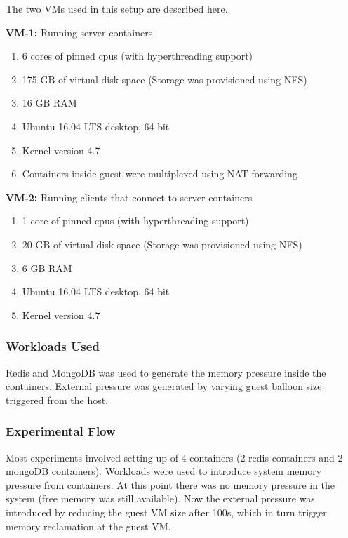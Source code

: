 	The two VMs used in this setup are described here.
	
	\noindent \textbf{VM-1:} Running server containers
	\begin{enumerate}
	  \item 6 cores of pinned cpus (with hyperthreading support)
	  \item 175 GB of virtual disk space (Storage was provisioned using NFS)
	  \item 16 GB RAM
	  \item Ubuntu 16.04 LTS desktop, 64 bit
	  \item Kernel version 4.7
	  \item Containers inside guest were multiplexed using NAT forwarding
	\end{enumerate}
	
	\noindent \textbf{VM-2:} Running clients that connect to server containers
	\begin{enumerate}
	  \item 1 core of pinned cpus (with hyperthreading support)
	  \item 20 GB of virtual disk space (Storage was provisioned using NFS)
	  \item 6 GB RAM
	  \item Ubuntu 16.04 LTS desktop, 64 bit
	  \item Kernel version 4.7
	\end{enumerate}
	
      \subsubsection{Workloads Used}
	
	Redis and MongoDB was used to generate the memory pressure inside the containers. External pressure was generated by varying guest 
balloon size triggered from the host.

      \subsubsection{Experimental Flow}
	
	Most experiments involved setting up of 4 containers (2 redis containers and 2 mongoDB containers). Workloads were used to 
introduce system memory pressure from containers. At this point there was no memory pressure in the system (free memory was still 
available). Now the external pressure was introduced by reducing the guest VM size after 100s, which in turn trigger memory reclamation at 
the guest VM. 


